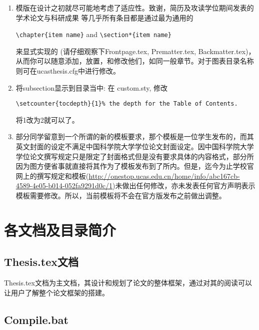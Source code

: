 \begin{enumerate}
      \verb+C:\Program Files\MiKTeX 2.9\miktex\bin\x64+

       找到并运行updmap.exe。
   \item 模版在设计之初就尽可能地考虑了适应性。致谢，简历及攻读学位期间发表的学术论文与科研成果
       等几乎所有条目都是通过最为通用的
       
       \verb+\chapter{item name}+  and \verb+\section*{item name}+

       来显式实现的 (请仔细观察下Frontpage.tex, Prematter.tex, Backmatter.tex)，从而你可以随意添加，放置，和修改他们，如同一般章节。对于图表目录名称则可在ucasthesis.cfg中进行修改。
    \item 将subsection显示到目录当中: 在 custom.sty, 修改
        
        \verb|\setcounter{tocdepth}{1}% the depth for the Table of Contents.|

       将1改为2就可以了。
    \item 部分同学留意到一个所谓的新的模板要求，那个模板是一位学生发布的，而其英文封面的设定不满足中国科学院大学学位论文封面设定。因中国科学院大学学位论文撰写规定只是限定了封面格式但是没有要求具体的内容格式，部分所因为图方便省事就直接将其作为了模板发布到了所内。但是，迄今为止学校官网上的撰写规定和模板(\url{http://onestop.ucas.edu.cn/home/info/abc167cb-4589-4e05-b014-052fa9291d0c/1})未做出任何修改，亦未发表任何官方声明表示模板需要修改。所以，当前模板将不会在官方版发布之前做出调整。
\end{enumerate}

\section{各文档及目录简介}

\subsection{Thesis.tex文档 }

Thesis.tex文档为主文档，其设计和规划了论文的整体框架，通过对其的阅读可以让用户了解整个论文框架的搭建。

\subsection{Compile.bat}

